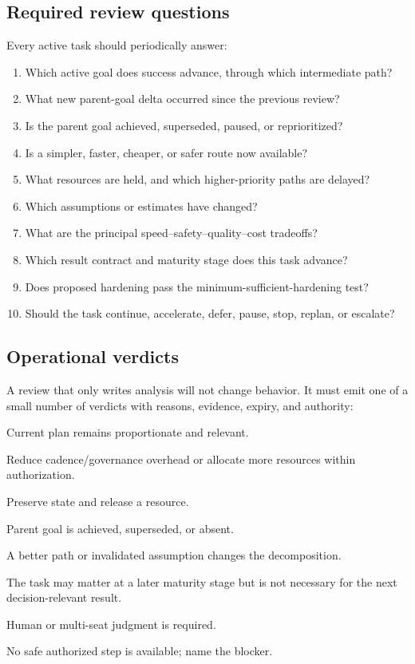 \documentclass[11pt,letterpaper]{article}
\newcommand{\verdict}[1]{\texttt{#1}}
\begin{document}
\subsection{Required review questions}

Every active task should periodically answer:

\begin{enumerate}
  \item Which active goal does success advance, through which intermediate path?
  \item What new parent-goal delta occurred since the previous review?
  \item Is the parent goal achieved, superseded, paused, or reprioritized?
  \item Is a simpler, faster, cheaper, or safer route now available?
  \item What resources are held, and which higher-priority paths are delayed?
  \item Which assumptions or estimates have changed?
  \item What are the principal speed--safety--quality--cost tradeoffs?
  \item Which result contract and maturity stage does this task advance?
  \item Does proposed hardening pass the minimum-sufficient-hardening test?
  \item Should the task continue, accelerate, defer, pause, stop, replan, or escalate?
\end{enumerate}

\subsection{Operational verdicts}

A review that only writes analysis will not change behavior. It must emit one
of a small number of verdicts with reasons, evidence, expiry, and authority:

\begin{description}[style=nextline]
  \item[\verdict{CONTINUE}] Current plan remains proportionate and relevant.
  \item[\verdict{ACCELERATE}] Reduce cadence/governance overhead or allocate
        more resources within authorization.
  \item[\verdict{PAUSE\_RECOVERABLY}] Preserve state and release a resource.
  \item[\verdict{STOP\_STALE}] Parent goal is achieved, superseded, or absent.
  \item[\verdict{REPLAN}] A better path or invalidated assumption changes the decomposition.
  \item[\verdict{DEFER}] The task may matter at a later maturity stage but is
        not necessary for the next decision-relevant result.
  \item[\verdict{ESCALATE}] Human or multi-seat judgment is required.
  \item[\verdict{BLOCKED}] No safe authorized step is available; name the blocker.
\end{description}
\end{document}
